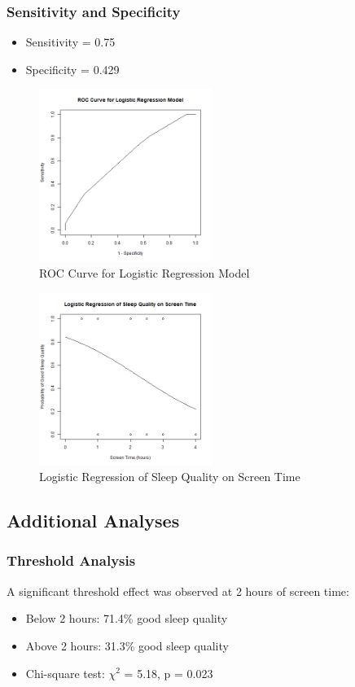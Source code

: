 \documentclass[conference]{IEEEtran}
\begin{document}
\subsubsection{Sensitivity and Specificity}
\begin{itemize}
\item Sensitivity = 0.75
\item Specificity = 0.429
\end{itemize}

\begin{figure}[htbp]
\centering
\includegraphics[width=0.5\textwidth]{chart.png}
\caption{ROC Curve for Logistic Regression Model}
\end{figure}

\begin{figure}[htbp]
\centering
\includegraphics[width=0.5\textwidth]{logistic_regression_plot.png}
\caption{Logistic Regression of Sleep Quality on Screen Time}
\end{figure}

\subsection{Additional Analyses}
\subsubsection{Threshold Analysis}
A significant threshold effect was observed at 2 hours of screen time:
\begin{itemize}
\item Below 2 hours: 71.4\% good sleep quality
\item Above 2 hours: 31.3\% good sleep quality
\item Chi-square test: \(\chi^2\) = 5.18, p = 0.023
\end{itemize}
\end{document}
